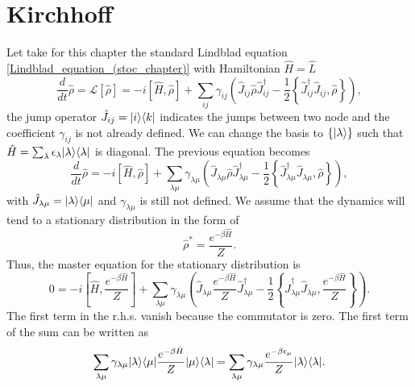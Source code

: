 \section{Kirchhoff}
Let take for this chapter the standard Lindblad equation \eqref{Lindblad_equation_(stoc_chapter)} with Hamiltonian $\hat H = \hat L$
\begin{equation}
    \frac{d}{dt}\hat\rho =\mathcal{L}\left[\hat\rho\right] = -i\left[\hat H,\hat\rho\right] + \sum_{ij} \gamma_{ij} \left(\hat J_{ij} \hat\rho \hat J^\dagger_{ij} - \frac{1}{2}\left\{ \hat J^\dagger_{ij}\hat J_{ij}, \hat\rho\right\} \right),
\end{equation}
the jump operator $\hat J_{ij} = \lvert i\rangle\langle k\rvert$ indicates the jumps between two node and the coefficient $\gamma_{ij}$ is not already defined.
We can change the basis to $\{\lvert\lambda\rangle\}$ such that $\hat H = \sum_\lambda \epsilon_\lambda\lvert\lambda\rangle\langle\lambda\rvert$ is diagonal. The previous equation becomes
\begin{equation}
    \frac{d}{dt}\hat\rho = -i\left[\hat H,\hat\rho\right] + \sum_{\lambda\mu} \gamma_{\lambda\mu} \left(\hat J_{\lambda\mu} \hat\rho \hat J^\dagger_{\lambda\mu} - \frac{1}{2}\left\{ \hat J^\dagger_{\lambda\mu}\hat J_{\lambda\mu}, \hat\rho\right\} \right),
\end{equation}
with $\hat J_{\lambda\mu} = \lvert\lambda\rangle\langle\mu\rvert$ and $\gamma_{\lambda\mu}$ is still not defined.
We assume that the dynamics will tend to a stationary distribution in the form of
\begin{equation}\label{pretended_stationary_distribution}
    \hat \rho^* = \frac{e^{-\beta\hat H}}{Z}.
\end{equation}
Thus, the master equation for the stationary distribution is
\begin{equation}\label{cancel_master_equation}
    0 = -i\left[\hat H, \frac{e^{-\beta\hat H}}{Z}\right] + \sum_{\lambda\mu} \gamma_{\lambda\mu} \left(\hat J_{\lambda\mu}  \frac{e^{-\beta\hat H}}{Z} \hat J^\dagger_{\lambda\mu} - \frac{1}{2}\left\{ \hat J^\dagger_{\lambda\mu}\hat J_{\lambda\mu},  \frac{e^{-\beta\hat H}}{Z}\right\} \right).
\end{equation}
The first term in the r.h.s. vanish because the commutator is zero. 
The first term of the sum can be written as 
\begin{equation}
        \sum_{\lambda\mu} \gamma_{\lambda\mu} \lvert\lambda\rangle\langle\mu\rvert\frac{e^{-\beta\hat H}}{Z} \lvert\mu\rangle\langle\lambda\rvert = 
        \sum_{\lambda\mu} \gamma_{\lambda\mu} \frac{e^{-\beta \epsilon_\mu}}{Z} \lvert\lambda\rangle\langle\lambda\rvert.
\end{equation}

